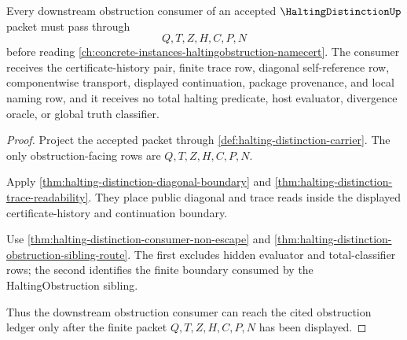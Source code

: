 \begin{theorem}
\label{thm:halting-distinction-obstruction-consumer-boundary}
Every downstream obstruction consumer of an accepted $\HaltingDistinctionUp$ packet must pass through
$$
Q,T,Z,H,C,P,N
$$
before reading \autoref{ch:concrete-instances-haltingobstruction-namecert}. The consumer receives the certificate-history pair, finite trace row, diagonal self-reference row, componentwise transport, displayed continuation, package provenance, and local naming row, and it receives no total halting predicate, host evaluator, divergence oracle, or global truth classifier.
\end{theorem}
\begin{proof}
Project the accepted packet through \autoref{def:halting-distinction-carrier}. The only obstruction-facing rows are $Q,T,Z,H,C,P,N$.

Apply \autoref{thm:halting-distinction-diagonal-boundary} and \autoref{thm:halting-distinction-trace-readability}. They place public diagonal and trace reads inside the displayed certificate-history and continuation boundary.

Use \autoref{thm:halting-distinction-consumer-non-escape} and \autoref{thm:halting-distinction-obstruction-sibling-route}. The first excludes hidden evaluator and total-classifier rows; the second identifies the finite boundary consumed by the HaltingObstruction sibling.

Thus the downstream obstruction consumer can reach the cited obstruction ledger only after the finite packet $Q,T,Z,H,C,P,N$ has been displayed.
\end{proof}

